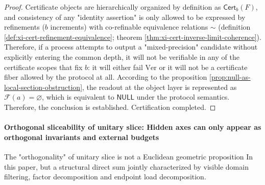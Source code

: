 \begin{proof}
Certificate objects are hierarchically organized by definition as \(\mathsf{Cert}_b(F)\), and consistency of any "identity assertion" is only allowed to be expressed by refinements (\(b\) increments) with co-refinable equivalence relations \(\sim\) (definition \ref{def:xi-cert-refinement-equivalence}; theorem \ref{thm:xi-cert-inverse-limit-coherence}).
Therefore, if a process attempts to output a "mixed-precision" candidate without explicitly entering the common depth, it will not be verifiable in any of the certificate scopes that fix \(b\): it will either fail \(\mathrm{Ver}\) or it will not be a certificate fiber allowed by the protocol at all.
According to the proposition \ref{prop:null-as-local-section-obstruction}, the readout at the object layer is represented as \(\mathscr F(a)=\varnothing\), which is equivalent to \(\mathsf{NULL}\) under the protocol semantics.
Therefore, the conclusion is established. Certification completed.
\end{proof}

\paragraph{Orthogonal sliceability of unitary slice: Hidden axes can only appear as orthogonal invariants and external budgets}
The "orthogonality" of unitary slice is not a Euclidean geometric proposition In this paper, but a structural direct sum jointly characterized by visible domain filtering, factor decomposition and endpoint load decomposition.

